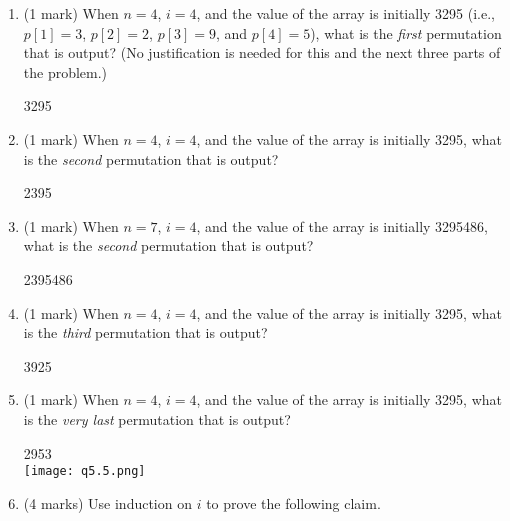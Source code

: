 \documentclass[11pt]{article}
\begin{document}
\begin{enumerate}
\item (1 mark)
  When $n=4$, $i=4$, and the value of the array is initially 3295  (i.e., $p[1] = 3$, $p[2]= 2$, $p[3]=9$, and $p[4]= 5$), what is the {\em first} permutation that is output?
(No justification is needed for this and the next three parts of the problem.)\\
\begin{soln}
    3295
\end{soln}

\item (1 mark)
  When $n=4$, $i=4$, and the value of the array is initially 3295, what is the {\em second} permutation that is output?\\
\begin{soln}
    2395
\end{soln}

\item (1 mark)
When $n=7$, $i=4$, and the value of the array is initially 3295486, what is the {\em second} permutation that is output?\\
\begin{soln}
    2395486
\end{soln}

\item (1 mark)
When $n=4$, $i=4$, and the value of the array is initially 3295, what is the {\em third} permutation that is output?\\
\begin{soln}
    3925
\end{soln}

\item (1 mark)
When $n=4$, $i=4$, and the value of the array is initially 3295, what is the {\em very last} permutation that is output?\\
\begin{soln}
    2953\\
    \texttt{[image: q5.5.png]}
\end{soln}


\item (4 marks)
Use induction on $i$ to prove the following claim.  


\end{enumerate}
\end{document}
